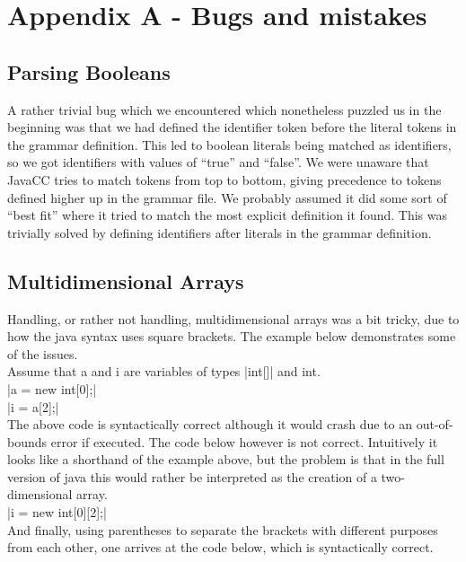 \documentclass[paper=a4, fontsize=11pt]{scrartcl} %
\numberwithin{equation}{section} %
\numberwithin{figure}{section} %
\numberwithin{table}{section} %
\begin{document}
\section{Appendix A - Bugs and mistakes}

\subsection{Parsing Booleans}

A rather trivial bug which we encountered which nonetheless puzzled us in the beginning was that we had defined the identifier token before the literal tokens in the grammar definition.
This led to boolean literals being matched as identifiers, so we got identifiers with values of “true” and “false”.
We were unaware that JavaCC tries to match tokens from top to bottom, giving precedence to tokens defined higher up in the grammar file.
We probably assumed it did some sort of “best fit” where it tried to match the most explicit definition it found.
This was trivially solved by defining identifiers after literals in the grammar definition.

\subsection{Multidimensional Arrays}

Handling, or rather not handling, multidimensional arrays was a bit tricky, due to how the java syntax uses square brackets. The example below demonstrates some of the issues.\\

Assume that a and i are variables of types |int[]| and int.\\

|a = new int[0];|\\
|i = a[2];|\\

The above code is syntactically correct although it would crash due to an out-of-bounds error if executed.
The code below however is not correct.
Intuitively it looks like a shorthand of the example above, but the problem is that in the full version of java this would rather be interpreted as the creation of a two-dimensional array.\\

|i = new int[0][2];|\\

And finally, using parentheses to separate the brackets with different purposes from each other, one arrives at the code below, which is syntactically correct.\\
\end{document}
